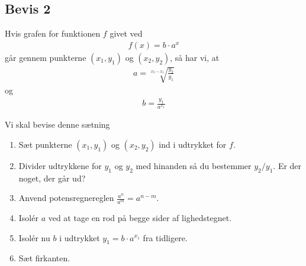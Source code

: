 \subsection*{Bevis 2}
\begin{setn}
	Hvis grafen for funktionen $f$ givet ved
	\begin{align*}
		f(x) = b\cdot a^x
	\end{align*}	 
	går gennem punkterne $(x_1,y_1)$ og $(x_2,y_2)$, så har vi, at 
	\begin{align*}
		a = \sqrt[x_2-x_1]{\frac{y_2}{y_1}}
	\end{align*}
	og
	\begin{align*}
		b = \frac{y_1}{a^{x_1}}
	\end{align*}
\end{setn}
Vi skal bevise denne sætning
\begin{enumerate}[label=\roman*)]
	\item Sæt punkterne $(x_1,y_1)$ og $(x_2,y_2)$ ind i udtrykket for $f$. 
	\item Divider udtrykkene for $y_1$ og $y_2$ med hinanden så du bestemmer $y_2/y_1$. Er der noget, der går ud?
	\item Anvend potensregnereglen $\frac{a^n}{a^m} = a^{n-m}$.
	\item Isolér $a$ ved at tage en rod på begge sider af lighedstegnet. 
	\item Isolér nu $b$ i udtrykket $y_1 = b\cdot a^{x_1}$ fra tidligere.
	\item Sæt firkanten.
\end{enumerate}

\newpage

